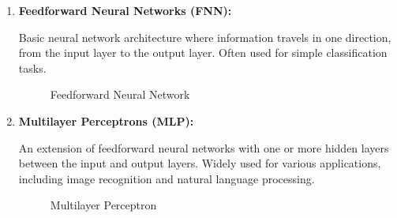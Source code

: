 \documentclass{article}
\begin{document}
\begin{enumerate}[label=\arabic*.]

    \item \textbf{Feedforward Neural Networks (FNN):}

          Basic neural network architecture where information travels in one direction, from the input layer to the output layer. Often used for simple classification tasks.

          \begin{figure}[ht]
              \centering
              \caption{Feedforward Neural Network}
          \end{figure}

    \item \textbf{Multilayer Perceptrons (MLP):}

          An extension of feedforward neural networks with one or more hidden layers between the input and output layers. Widely used for various applications, including image recognition and natural language processing.

          \begin{figure}[ht]
              \centering
              \caption{Multilayer Perceptron}
          \end{figure}


\end{enumerate}
\end{document}
